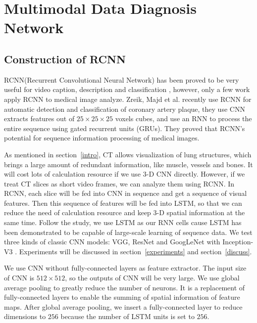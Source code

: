 \section{Multimodal Data Diagnosis Network}
\label{MDDNetwork}
\subsection{Construction of RCNN}
\label{RCNN}
RCNN(Recurrent Convolutional Neural Network) has been proved to be very useful for video caption, description and classification \cite{Donahue2015Long}\cite{Aafaq2019Spatio}, however, only a few work apply RCNN to medical image analyze. Zreik, Majd et al. \cite{Zreik2018A} recently use RCNN for automatic detection and classification of coronary artery plaque, they use CNN extracts features out of $ 25\times25\times25$ voxels cubes, and  use an RNN to process the entire sequence using gated recurrent units (GRUs)\cite{chung2014empirical}. They proved that RCNN's potential for sequence information processing of medical images. 

As mentioned in section~\ref{intro}, CT allows visualization of lung structures, which brings a large amount of redundant information, like muscle, vessels and bones. It will cost lots of calculation resource if we use 3-D CNN directly. However, if we treat CT slices as short video frames, we can analyze them using RCNN. In RCNN, each slice will be fed into CNN in sequence and get a sequence of visual features. Then this sequence of features will be fed into LSTM, so that we can reduce the need of calculation resource and keep 3-D spatial information at the same time. 
Follow the study\cite{Donahue2015Long}, we use LSTM as our RNN cells cause LSTM has been demonstrated to be capable of large-scale learning of sequence data. We test three kinds of classic CNN models: VGG\cite{simonyan2015very}, ResNet\cite{he2016deep} and GoogLeNet with Inception-V3 \cite{szegedy2016rethinking}. Experiments will be discussed in section~\ref{experiments} and section~\ref{discuss}.

We use CNN without fully-connected layers as feature extractor. The input size of CNN is $512 \times 512$, so the outputs of CNN will be very large. We use global average pooling\cite{lin2014network} to greatly reduce the number of neurons. It is a replacement of fully-connected layers to enable the summing of spatial information of feature maps. After global average pooling, we insert a fully-connected layer to reduce dimensions to $256$ because the number of LSTM units is set to $256$\cite{Donahue2015Long}.


